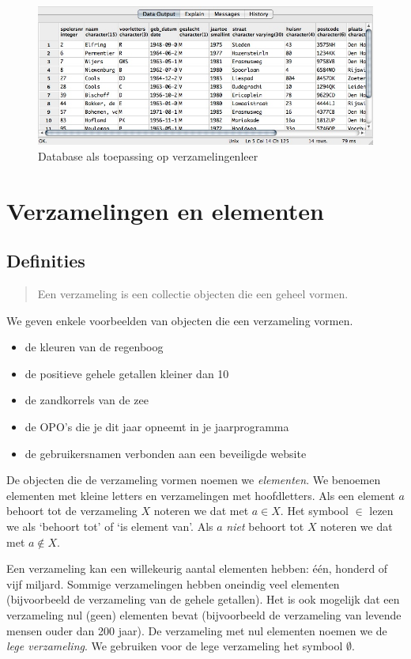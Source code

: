 \begin{figure}[htbp]
\centering
\includegraphics[width=\textwidth]{figuren/verzamelingen_relaties/database.jpg}
\caption{Database als toepassing op verzamelingenleer}
\label{fig:database}
\end{figure}

\section{Verzamelingen en elementen}
\subsection{Definities}
\begin{quote}
Een verzameling is een collectie objecten die een geheel vormen.
\end{quote}
We geven enkele voorbeelden van objecten die een verzameling vormen.
\begin{itemize}
  \item de kleuren van de regenboog 
  \item de positieve gehele getallen kleiner dan 10
  \item de zandkorrels van de zee
  \item de OPO's die je dit jaar opneemt in je jaarprogramma 
  \item de gebruikersnamen verbonden aan een beveiligde website
\end{itemize}

De objecten die de verzameling vormen noemen we \emph{elementen}. We benoemen elementen met kleine letters en verzamelingen met hoofdletters. Als een element $a$ behoort tot de verzameling $X$ noteren we dat met $a \in X$. Het symbool $\in$\index{\ensuremath{\in}} lezen we als `behoort tot' of `is element van'. Als $a$ \emph{niet} behoort tot $X$ noteren we dat met $a\not \in X $\index{\ensuremath{\not\in}}.

Een verzameling kan een willekeurig aantal elementen hebben: \'e\'en, honderd of vijf miljard. Sommige verzamelingen hebben oneindig veel elementen (bijvoorbeeld de verzameling van de gehele getallen). Het is ook mogelijk dat een verzameling nul (geen) elementen bevat (bijvoorbeeld de verzameling van levende mensen ouder dan 200 jaar). De verzameling met nul elementen noemen we de \emph{lege verzameling}. We gebruiken voor de lege verzameling het symbool $\emptyset$\index{\ensuremath{\emptyset}}.

